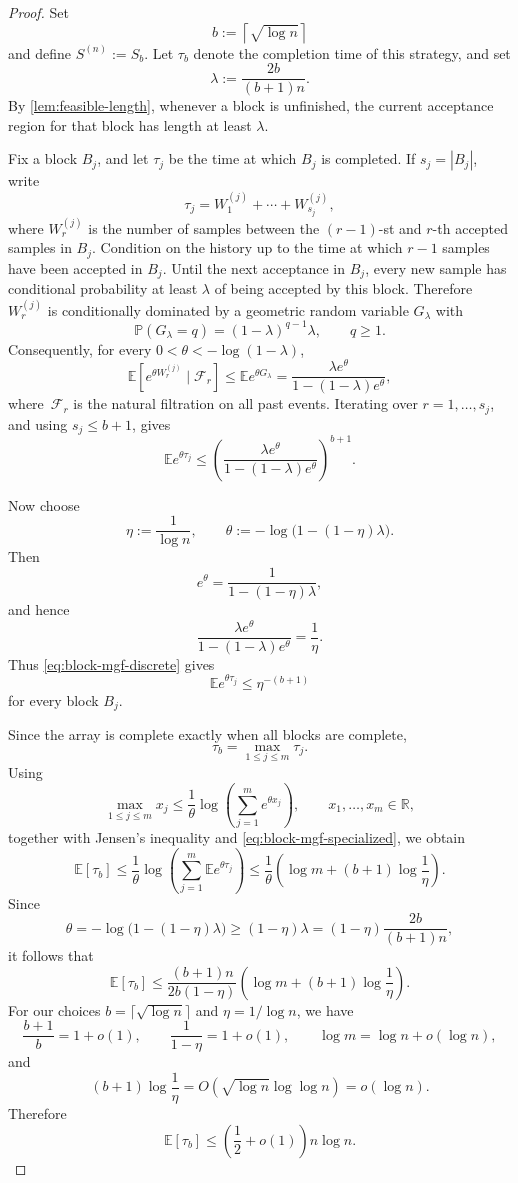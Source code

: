 \documentclass[10pt,a4paper]{amsart}
\newcommand{\E}{\mathbb{E}}
\newcommand{\R}{\mathbb{R}}
\newcommand{\mc}{\mathcal}
\renewcommand{\P}{\mathbb{P}}
\begin{document}
\begin{proof}
Set
\[
b:=\left\lceil \sqrt{\log n}\right\rceil
\]
and define \(S^{(n)}:=S_b\). Let \(\tau_b\) denote the completion time of this strategy, and set
\[
\lambda:=\frac{2b}{(b+1)n}.
\]
By \cref{lem:feasible-length}, whenever a block is unfinished, the current acceptance region for that block has length at least \(\lambda\).

Fix a block \(B_j\), and let \(\tau_j\) be the time at which \(B_j\) is completed. If \(s_j=|B_j|\), write
\[
\tau_j=W_1^{(j)}+\cdots+W_{s_j}^{(j)},
\]
where \(W_r^{(j)}\) is the number of samples between the \((r-1)\)-st and \(r\)-th accepted samples in \(B_j\). Condition on the history up to the time at which \(r-1\) samples have been accepted in \(B_j\). Until the next acceptance in \(B_j\), every new sample has conditional probability at least \(\lambda\) of being accepted by this block. Therefore \(W_r^{(j)}\) is conditionally dominated by a geometric random variable \(G_\lambda\) with
\[
\P(G_\lambda=q)=(1-\lambda)^{q-1}\lambda,
\qquad q\ge1.
\]
Consequently, for every \(0<\theta<-\log(1-\lambda)\),
\[
\E\left[e^{\theta W_r^{(j)}}\mid \mc F_r \right]
\le
\E e^{\theta G_\lambda}
=
\frac{\lambda e^\theta}{1-(1-\lambda)e^\theta},
\]
where~$\mc F_r$ is the natural filtration on all past events.
Iterating over \(r=1,\dots,s_j\), and using \(s_j\le b+1\), gives
\begin{equation}\label{eq:block-mgf-discrete}
\E e^{\theta\tau_j}
\le
\left(\frac{\lambda e^\theta}{1-(1-\lambda)e^\theta}\right)^{b+1}.
\end{equation}

Now choose
\[
\eta:=\frac1{\log n},
\qquad
\theta:=-\log\bigl(1-(1-\eta)\lambda\bigr).
\]
Then
\[
e^\theta=\frac{1}{1-(1-\eta)\lambda},
\]
and hence
\[
\frac{\lambda e^\theta}{1-(1-\lambda)e^\theta}=\frac1\eta.
\]
Thus \eqref{eq:block-mgf-discrete} gives
\begin{equation}\label{eq:block-mgf-specialized}
\E e^{\theta\tau_j}\le \eta^{-(b+1)}
\end{equation}
for every block \(B_j\).

Since the array is complete exactly when all blocks are complete,
\[
\tau_b=\max_{1\le j\le m}\tau_j.
\]
Using
\[
\max_{1\le j\le m} x_j
\le
\frac1\theta\log\left(\sum_{j=1}^m e^{\theta x_j}\right),
\qquad x_1,\dots,x_m\in\R,
\]
together with Jensen's inequality and \eqref{eq:block-mgf-specialized}, we obtain
\[
\E[\tau_b]
\le
\frac1\theta
\log\left(\sum_{j=1}^m \E e^{\theta\tau_j}\right)
\le
\frac1\theta
\left(
\log m+(b+1)\log\frac1\eta
\right).
\]
Since
\[
\theta
=
-\log\bigl(1-(1-\eta)\lambda\bigr)
\ge
(1-\eta)\lambda
=
(1-\eta)\frac{2b}{(b+1)n},
\]
it follows that
\[
\E[\tau_b]
\le
\frac{(b+1)n}{2b(1-\eta)}
\left(
\log m+(b+1)\log\frac1\eta
\right).
\]
For our choices \(b=\lceil\sqrt{\log n}\rceil\) and \(\eta=1/\log n\), we have
\[
\frac{b+1}{b}=1+o(1),
\qquad
\frac1{1-\eta}=1+o(1),
\qquad
\log m=\log n+o(\log n),
\]
and
\[
(b+1)\log\frac1\eta
=
O(\sqrt{\log n}\log\log n)
=
o(\log n).
\]
Therefore
\[
\E[\tau_b]
\le
\left(\frac12+o(1)\right)n\log n.
\]


\end{proof}
\end{document}
